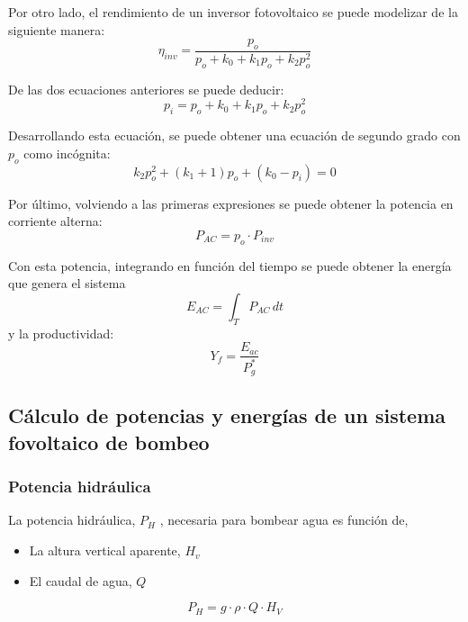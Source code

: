 Por otro lado, el rendimiento de un inversor fotovoltaico se puede modelizar de la siguiente manera:
\begin{equation}
\eta_{inv}=\frac{p_o}{p_o+k_0+k_1p_o+k_2p_o^2}
\end{equation}

De las dos ecuaciones anteriores se puede deducir:
\begin{equation}
p_i=p_o+k_0+k_1p_o+k_2p_o^2
\end{equation}

Desarrollando esta ecuación, se puede obtener una ecuación de segundo grado con \(p_o\) como incógnita:
\begin{equation}
k_2p_o^2+(k_1+1)p_o+(k_0-p_i)=0
\end{equation}

Por último, volviendo a las primeras expresiones se puede obtener la potencia en corriente alterna:
\begin{equation}
P_{AC}=p_o\cdot P_{inv}
\end{equation}

Con esta potencia, integrando en función del tiempo se puede obtener la energía que genera el sistema
\begin{equation}
E_{AC}=\int_{T} P_{AC} \,dt
\end{equation}
y la productividad:
\begin{equation}
Y_f=\frac{E_{ac}}{P_g^*}
\end{equation}

\subsection{Cálculo de potencias y energías de un sistema fovoltaico de bombeo}
\label{sec:orgf769e58}
\subsubsection{Potencia hidráulica}
\label{sec:orgd481ec4}
La potencia hidráulica, \(P_H\) , necesaria para bombear agua es función de,
\begin{itemize}
\item La altura vertical aparente, \(H_v\) 
\item El caudal de agua, \(Q\)   
\end{itemize}
\begin{equation}
P_H=g\cdot \rho \cdot Q \cdot H_V
\end{equation}

